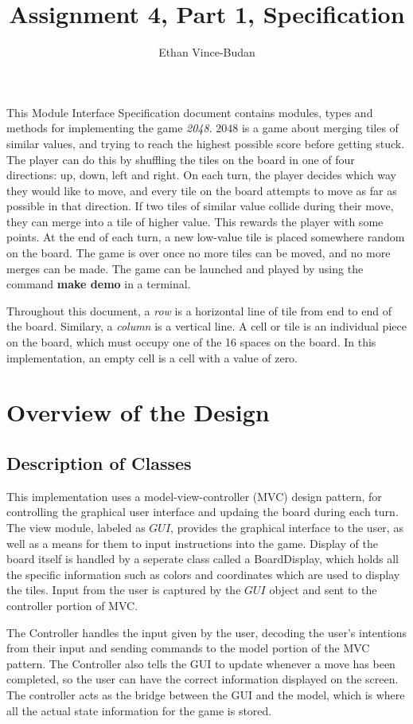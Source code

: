 \documentclass{article}
\title{Assignment 4, Part 1, Specification}
\author{Ethan Vince-Budan}
\begin{document}
\maketitle

This Module Interface Specification document contains modules, types and methods for implementing the game \textit{2048}. $2048$ is a game about merging tiles of similar values, and trying to reach the highest possible score before getting stuck. The player can do this by shuffling the tiles on the board in one of four directions: up, down, left and right. On each turn, the player decides which way they would like to move, and every tile on the board attempts to move as far as possible in that direction. If two tiles of similar value collide during their move, they can merge into a tile of higher value. This rewards the player with some points. At the end of each turn, a new low-value tile is placed somewhere random on the board. The game is over once no more tiles can be moved, and no more merges can be made. The game can be launched and played by using the command \textbf{make demo} in a terminal.

Throughout this document, a \textit{row} is a horizontal line of tile from end to end of the board. Similary, a \textit{column} is a vertical line. A cell or tile is an individual piece on the board, which must occupy one of the 16 spaces on the board. In this implementation, an empty cell is a cell with a value of zero.

\section{Overview of the Design}
	\subsection{Description of Classes}
		This implementation uses a model-view-controller (MVC) design pattern, for controlling the graphical user interface and updaing the board during each turn. The view module, labeled as $GUI$, provides the graphical interface to the user, as well as a means for them to input instructions into the game. Display of the board itself is handled by a seperate class called a BoardDisplay, which holds all the specific information such as colors and coordinates which are used to display the tiles. Input from the user is captured by the $GUI$ object and sent to the controller portion of MVC.

		The Controller handles the input given by the user, decoding the user's intentions from their input and sending commands to the model portion of the MVC pattern. The Controller also tells the GUI to update whenever a move has been completed, so the user can have the correct information displayed on the screen. The controller acts as the bridge between the GUI and the model, which is where all the actual state information for the game is stored.
\end{document}
